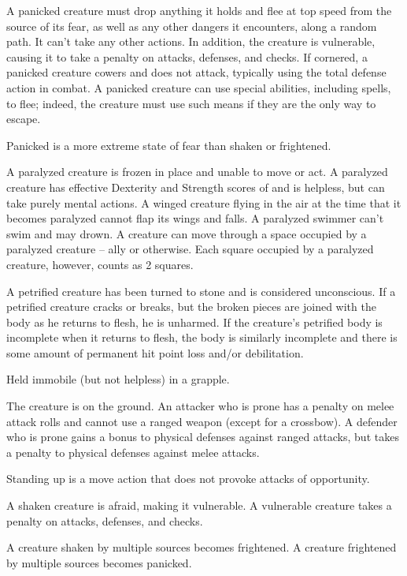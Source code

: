  A panicked creature must drop anything it holds and flee at top speed from the source of its fear, as well as any other dangers it encounters, along a random path. It can't take any other actions. In addition, the creature is vulnerable, causing it to take a  penalty on attacks, defenses, and checks. If cornered, a panicked creature cowers and does not attack, typically using the total defense action in combat. A panicked creature can use special abilities, including spells, to flee; indeed, the creature must use such means if they are the only way to escape.

Panicked is a more extreme state of fear than shaken or frightened.

 A paralyzed creature is frozen in place and unable to move or act. A paralyzed creature has effective Dexterity and Strength scores of  and is helpless, but can take purely mental actions. A winged creature flying in the air at the time that it becomes paralyzed cannot flap its wings and falls. A paralyzed swimmer can't swim and may drown. A creature can move through a space occupied by a paralyzed creature -- ally or otherwise. Each square occupied by a paralyzed creature, however, counts as 2 squares.

 A petrified creature has been turned to stone and is considered unconscious. If a petrified creature cracks or breaks, but the broken pieces are joined with the body as he returns to flesh, he is unharmed. If the creature's petrified body is incomplete when it returns to flesh, the body is similarly incomplete and there is some amount of permanent hit point loss and/or debilitation.

 Held immobile (but not helpless) in a grapple.

 The creature is on the ground. An attacker who is prone has a  penalty on melee attack rolls and cannot use a ranged weapon (except for a crossbow). A defender who is prone gains a  bonus to physical defenses against ranged attacks, but takes a  penalty to physical defenses against melee attacks.

Standing up is a move action that does not provoke attacks of opportunity.

 A shaken creature is afraid, making it vulnerable. A vulnerable creature takes a  penalty on attacks, defenses, and checks.

A creature shaken by multiple sources becomes frightened. A creature frightened by multiple sources becomes panicked.

